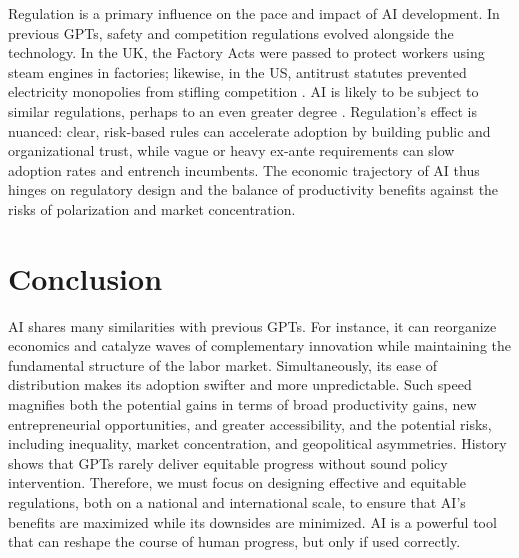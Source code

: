\documentclass[12pt, a4paper, twoside]{article}
\begin{document}
Regulation is a primary influence on the pace and impact of AI development. In previous GPTs, safety and competition regulations evolved alongside the technology. In the UK, the Factory Acts were passed to protect workers using steam engines in factories; likewise, in the US, antitrust statutes prevented electricity monopolies from stifling competition \autocite{UKParliamentFactoryAct1833}. AI is likely to be subject to similar regulations, perhaps to an even greater degree \autocite[pp.\ 9--10]{ErdilBesiroglu2023ExplosiveGrowthAIAutomation}. Regulation’s effect is nuanced: clear, risk-based rules can accelerate adoption by building public and organizational trust, while vague or heavy ex-ante requirements can slow adoption rates and entrench incumbents. The economic trajectory of AI thus hinges on regulatory design and the balance of productivity benefits against the risks of polarization and market concentration.

\section{Conclusion}

AI shares many similarities with previous GPTs. For instance, it can reorganize economics and catalyze waves of complementary innovation while maintaining the fundamental structure of the labor market. Simultaneously, its ease of distribution makes its adoption swifter and more unpredictable. Such speed magnifies both the potential gains in terms of broad productivity gains, new entrepreneurial opportunities, and greater accessibility, and the potential risks, including inequality, market concentration, and geopolitical asymmetries. History shows that GPTs rarely deliver equitable progress without sound policy intervention. Therefore, we must focus on designing effective and equitable regulations, both on a national and international scale, to ensure that AI’s benefits are maximized while its downsides are minimized. AI is a powerful tool that can reshape the course of human progress, but only if used correctly.





\printbibliography
\end{document}
